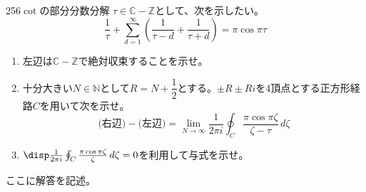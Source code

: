\begin{thm}{256}{}{$\cot$の部分分数分解}
 $\tau\in\mathbb{C}-\mathbb{Z}$として、次を示したい。
 \[ \frac{1}{\tau}+\sum_{d=1}^\infty\left(\frac{1}{\tau-d}+\frac{1}{\tau+d}\right)=\pi\cos\pi\tau \]
 \begin{enumerate}
  \item 左辺は$\mathbb{C}-\mathbb{Z}$で絶対収束することを示せ。
  \item 十分大きい$N\in\mathbb{N}$として$R=N+\dfrac{1}{2}$とする。$\pm R\pm Ri$を4頂点とする正方形経路$C$を用いて次を示せ。
	\[ \text{(右辺)}-\text{(左辺)}=\lim_{N\to\infty}\frac{1}{2\pi i}\oint_C\!\frac{\pi\cos\pi\zeta}{\zeta-\tau} \,d\zeta \]
  \item $\disp \frac{1}{2\pi i}\oint_C \frac{\pi\cos\pi\zeta}{\zeta} \,d\zeta=0$を利用して与式を示せ。
 \end{enumerate}
\end{thm}

ここに解答を記述。